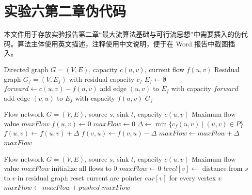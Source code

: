\documentclass[UTF8,fontset=none]{ctexart}
\begin{document}
\section*{实验六第二章伪代码}

本文件用于存放实验报告第二章“最大流算法基础与可行流思想”中需要插入的伪代码。算法主体使用英文描述，注释使用中文说明，便于在 Word 报告中截图插入。

\begin{algorithm}[H]
\caption{Residual Network Construction}
\begin{algorithmic}[1]
\Require Directed graph $G=(V,E)$, capacity $c(u,v)$, current flow $f(u,v)$
\Ensure Residual graph $G_f=(V,E_f)$ with residual capacity $c_f$
\State $E_f \gets \emptyset$
    \State $forward \gets c(u,v)-f(u,v)$
        \State add edge $(u,v)$ to $E_f$ with capacity $forward$
    \EndIf
        \State add edge $(v,u)$ to $E_f$ with capacity $f(u,v)$
    \EndIf
\EndFor
\State \Return $G_f$
\end{algorithmic}
\end{algorithm}

\begin{algorithm}[H]
\caption{Edmonds-Karp Maximum Flow}
\begin{algorithmic}[1]
\Require Flow network $G=(V,E)$, source $s$, sink $t$, capacity $c(u,v)$
\Ensure Maximum flow value $maxFlow$
    \State $f(u,v) \gets 0$
\EndFor
\State $maxFlow \gets 0$
    \State $\Delta \gets \min\{c_f(u,v) \mid (u,v) \in P\}$
            \State $f(u,v) \gets f(u,v)+\Delta$
        \Else
            \State $f(v,u) \gets f(v,u)-\Delta$
        \EndIf
    \EndFor
    \State $maxFlow \gets maxFlow+\Delta$
\EndWhile
\State \Return $maxFlow$
\end{algorithmic}
\end{algorithm}

\begin{algorithm}[H]
\caption{Dinic Maximum Flow}
\begin{algorithmic}[1]
\Require Flow network $G=(V,E)$, source $s$, sink $t$, capacity $c(u,v)$
\Ensure Maximum flow value $maxFlow$
\State initialize all flows to $0$
\State $maxFlow \gets 0$
    \State $level[v] \gets$ distance from $s$ to $v$ in residual graph
    \State reset current arc pointer $cur[v]$ for every vertex $v$
        \State $maxFlow \gets maxFlow+pushed$
    \EndWhile
\EndWhile
\State \Return $maxFlow$
\end{algorithmic}
\end{algorithm}
\end{document}
